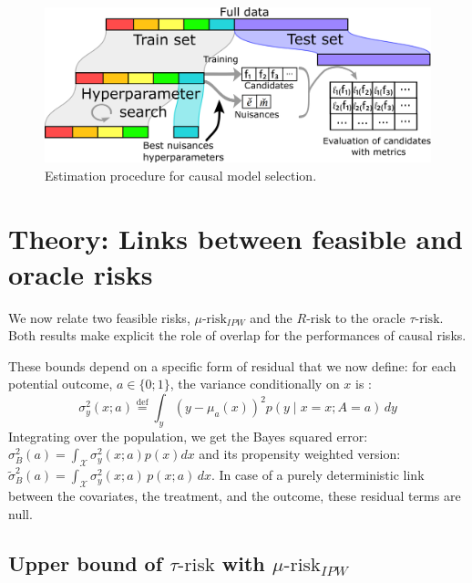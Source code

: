\documentclass{report}
\begin{document}
\begin{figure}[h!]
  \includegraphics[width=\linewidth]{img/chapter_5/estimation_procedure_causal_selection_procedure.png}
  \caption{Estimation procedure for causal model
    selection.}\label{problem:estimation_procedure:figure}
\end{figure}



\section{Theory: Links between feasible and oracle risks}\label{sec:theory}

We now relate two feasible risks, $\mu \text{-risk}_{IPW}$ and the
$R\text{-risk}$ to the oracle $\tau\text{-risk}$. Both results make
explicit the role of overlap for the performances of causal risks.

These bounds depend on a specific form of residual that we now define: for each potential outcome, $a \in  \{0; 1\}$, the variance conditionally on $x$
is \citep{shalit_estimating_2017}:
\begin{equation*}\label{eq:residuals}
  \sigma_{y}^{2}(x ; a) \overset{\text{def}}{=}
  \int_{y}\left(y-\mu_{a}(x)\right)^{2} p(y \mid x=x ; A=a) \, d y
\end{equation*}
Integrating over the population, we get the Bayes squared error:
$\sigma^2_{B}(a) = \int_{\mathcal X} \sigma_y^2(x;a) p(x)dx$
and its propensity weighted version:
$\tilde{\sigma}^2_{B}(a) = \int_{\mathcal X}\sigma_y^2(x;a)\,  p(x;
  a)\,dx$. In case of a purely deterministic link between the
covariates, the treatment, and the outcome, these residual terms are null.


\subsection{Upper bound of $\tau\text{-risk}$ with $\mu\text{-risk}_{IPW}$}%
\label{theory:mu_risk_ipw_bound}%
\end{document}
